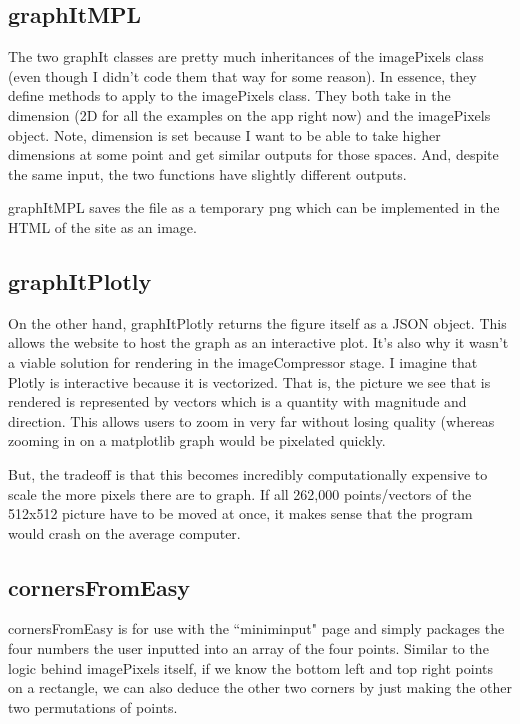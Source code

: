 \documentclass[10pt]{article}
\begin{document}
\begin{multicols*}{2}
\subsection{graphItMPL}

The two graphIt classes are pretty much inheritances of the imagePixels class (even though I didn't code them that way for some reason). In essence, they define methods to apply to the imagePixels class. They both take in the dimension (2D for all the examples on the app right now) and the imagePixels object. Note, dimension is set because I want to be able to take higher dimensions at some point and get similar outputs for those spaces. And, despite the same input, the two functions have slightly different outputs. 

graphItMPL saves the file as a temporary png which can be implemented in the HTML of the site as an image. 

\subsection{graphItPlotly}

On the other hand, graphItPlotly returns the figure itself as a JSON object. This allows the website to host the graph as an interactive plot. It's also why it wasn't a viable solution for rendering in the imageCompressor stage. I imagine that Plotly is interactive because it is vectorized. That is, the picture we see that is rendered is represented by vectors which is a quantity with magnitude and direction. This allows users to zoom in very far without losing quality (whereas zooming in on a matplotlib graph would be pixelated quickly.

But, the tradeoff is that this becomes incredibly computationally expensive to scale the more pixels there are to graph. If all 262,000 points/vectors of the 512x512 picture have to be moved at once, it makes sense that the program would crash on the average computer.

\subsection{cornersFromEasy}

cornersFromEasy is for use with the ``miniminput" page and simply packages the four numbers the user inputted into an array of the four points. Similar to the logic behind imagePixels itself, if we know the bottom left and top right points on a rectangle, we can also deduce the other two corners by just making the other two permutations of points.


\end{multicols*}
\end{document}
